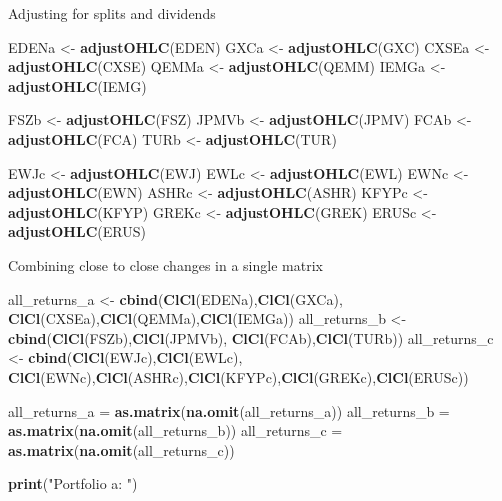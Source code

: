 \documentclass[]{article}
\newenvironment{Shaded}{\begin{snugshade}}{\end{snugshade}}
\newcommand{\KeywordTok}[1]{\textcolor[rgb]{0.13,0.29,0.53}{\textbf{#1}}}
\newcommand{\NormalTok}[1]{#1}
\newcommand{\StringTok}[1]{\textcolor[rgb]{0.31,0.60,0.02}{#1}}
\begin{document}
Adjusting for splits and dividends

\begin{Shaded}
\begin{Highlighting}[]
\NormalTok{EDENa <-}\StringTok{ }\KeywordTok{adjustOHLC}\NormalTok{(EDEN)}
\NormalTok{GXCa <-}\StringTok{ }\KeywordTok{adjustOHLC}\NormalTok{(GXC)}
\NormalTok{CXSEa <-}\StringTok{ }\KeywordTok{adjustOHLC}\NormalTok{(CXSE)}
\NormalTok{QEMMa <-}\StringTok{ }\KeywordTok{adjustOHLC}\NormalTok{(QEMM)}
\NormalTok{IEMGa <-}\StringTok{ }\KeywordTok{adjustOHLC}\NormalTok{(IEMG)}

\NormalTok{FSZb <-}\StringTok{ }\KeywordTok{adjustOHLC}\NormalTok{(FSZ)}
\NormalTok{JPMVb <-}\StringTok{ }\KeywordTok{adjustOHLC}\NormalTok{(JPMV)}
\NormalTok{FCAb <-}\StringTok{ }\KeywordTok{adjustOHLC}\NormalTok{(FCA)}
\NormalTok{TURb <-}\StringTok{ }\KeywordTok{adjustOHLC}\NormalTok{(TUR)}

\NormalTok{EWJc <-}\StringTok{ }\KeywordTok{adjustOHLC}\NormalTok{(EWJ)}
\NormalTok{EWLc <-}\StringTok{ }\KeywordTok{adjustOHLC}\NormalTok{(EWL)}
\NormalTok{EWNc <-}\StringTok{ }\KeywordTok{adjustOHLC}\NormalTok{(EWN)}
\NormalTok{ASHRc <-}\StringTok{ }\KeywordTok{adjustOHLC}\NormalTok{(ASHR)}
\NormalTok{KFYPc <-}\StringTok{ }\KeywordTok{adjustOHLC}\NormalTok{(KFYP)}
\NormalTok{GREKc <-}\StringTok{ }\KeywordTok{adjustOHLC}\NormalTok{(GREK)}
\NormalTok{ERUSc <-}\StringTok{ }\KeywordTok{adjustOHLC}\NormalTok{(ERUS)}
\end{Highlighting}
\end{Shaded}

Combining close to close changes in a single matrix

\begin{Shaded}
\begin{Highlighting}[]
\NormalTok{all_returns_a <-}\StringTok{ }\KeywordTok{cbind}\NormalTok{(}\KeywordTok{ClCl}\NormalTok{(EDENa),}\KeywordTok{ClCl}\NormalTok{(GXCa), }\KeywordTok{ClCl}\NormalTok{(CXSEa),}\KeywordTok{ClCl}\NormalTok{(QEMMa),}\KeywordTok{ClCl}\NormalTok{(IEMGa))}
\NormalTok{all_returns_b <-}\StringTok{ }\KeywordTok{cbind}\NormalTok{(}\KeywordTok{ClCl}\NormalTok{(FSZb),}\KeywordTok{ClCl}\NormalTok{(JPMVb), }\KeywordTok{ClCl}\NormalTok{(FCAb),}\KeywordTok{ClCl}\NormalTok{(TURb))}
\NormalTok{all_returns_c <-}\StringTok{ }\KeywordTok{cbind}\NormalTok{(}\KeywordTok{ClCl}\NormalTok{(EWJc),}\KeywordTok{ClCl}\NormalTok{(EWLc), }\KeywordTok{ClCl}\NormalTok{(EWNc),}\KeywordTok{ClCl}\NormalTok{(ASHRc),}\KeywordTok{ClCl}\NormalTok{(KFYPc),}\KeywordTok{ClCl}\NormalTok{(GREKc),}\KeywordTok{ClCl}\NormalTok{(ERUSc))}

\NormalTok{all_returns_a =}\StringTok{ }\KeywordTok{as.matrix}\NormalTok{(}\KeywordTok{na.omit}\NormalTok{(all_returns_a))}
\NormalTok{all_returns_b =}\StringTok{ }\KeywordTok{as.matrix}\NormalTok{(}\KeywordTok{na.omit}\NormalTok{(all_returns_b))}
\NormalTok{all_returns_c =}\StringTok{ }\KeywordTok{as.matrix}\NormalTok{(}\KeywordTok{na.omit}\NormalTok{(all_returns_c))}

\KeywordTok{print}\NormalTok{(}\StringTok{"Portfolio a: "}\NormalTok{)}
\end{Highlighting}
\end{Shaded}
\end{document}
